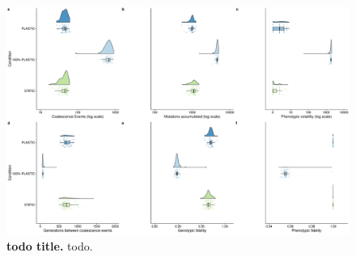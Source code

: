 
\begin{figure}[h!]
    \centering
    \includegraphics[width=1\textwidth]{media/evolutionary-change-full-panel.pdf}
    \caption{\small
    \textbf{todo title.}
    todo.
    }
    \label{fig:evolutionary-dynamics}
\end{figure}